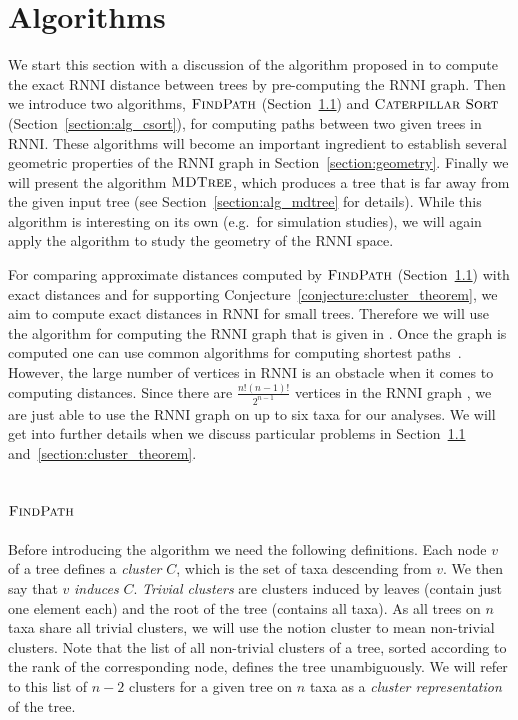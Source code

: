 \documentclass{amsart}
\newcommand{\rnni}{\mathrm{RNNI}}
\newcommand{\csort}{\textsc{Caterpillar Sort}}
\newcommand{\findpath}{\textsc{FindPath}}
\newcommand{\mdtree}{\textsc{MDTree}}
\begin{document}
\section{Algorithms}
\label{section:algorithms}

We start this section with a discussion of the algorithm proposed in \autocite{Gavryushkin2018-ol} to compute the exact $\rnni$ distance between trees by pre-computing the $\rnni$ graph.
Then we introduce two algorithms, $\findpath$ (Section~\ref{section:alg_findpath}) and $\csort$ (Section~\ref{section:alg_csort}), for computing paths between two given trees in $\rnni$.
These algorithms will become an important ingredient to establish several geometric properties of the $\rnni$ graph in Section~\ref{section:geometry}.
Finally we will present the algorithm $\mdtree$, which produces a tree that is far away from the given input tree (see Section~\ref{section:alg_mdtree} for details).
While this algorithm is interesting on its own (e.g.\ for simulation studies), we will again apply the algorithm to study the geometry of the $\rnni$ space.

For comparing approximate distances computed by $\findpath$ (Section~\ref{section:alg_findpath}) with exact distances and for supporting Conjecture~\ref{conjecture:cluster_theorem}, we aim to compute exact distances in $\rnni$ for small trees.
Therefore we will use the algorithm for computing the $\rnni$ graph that is given in \textcite[Section 3.3]{Gavryushkin2018-ol}.
Once the graph is computed one can use common algorithms for computing shortest paths~\autocite{Floyd1962-ew,Dijkstra1959-ph}.
However, the large number of vertices in $\rnni$ is an obstacle when it comes to computing distances.
Since there are $\frac{n!(n-1)!}{2^{n-1}}$ vertices in the $\rnni$ graph \autocite{Gavryushkin2018-ol}, we are just able to use the $\rnni$ graph on up to six taxa for our analyses.
We will get into further details when we discuss particular problems in Section~\ref{section:alg_findpath} and~\ref{section:cluster_theorem}.


\subsection{$\findpath$}
\label{section:alg_findpath}

Before introducing the algorithm we need the following definitions.
Each node $v$ of a tree defines a \emph{cluster} $C$, which is the set of taxa descending from $v$.
We then say that $v$ \emph{induces} $C$.
\emph{Trivial clusters} are clusters induced by leaves (contain just one element each) and the root of the tree (contains all taxa).
As all trees on $n$ taxa share all trivial clusters, we will use the notion cluster to mean non-trivial clusters.
Note that the list of all non-trivial clusters of a tree, sorted according to the rank of the corresponding node, defines the tree unambiguously.
We will refer to this list of $n-2$ clusters for a given tree on $n$ taxa as a \emph{cluster representation} of the tree.
\end{document}
